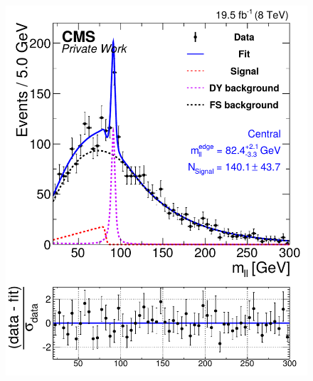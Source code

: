 \begin{figure}[!hbp]
  \centering
  \begin{minipage}[t]{0.49\textwidth}
    \includegraphics[width=\textwidth]{plots/results/fit/fit2012_ETHTriangle_SignalInclusive_Combined_Full2012_ETHTriangle_Central.pdf}
  \end{minipage}
  \begin{minipage}[t]{0.49\textwidth}

\end{minipage}
\end{figure}
